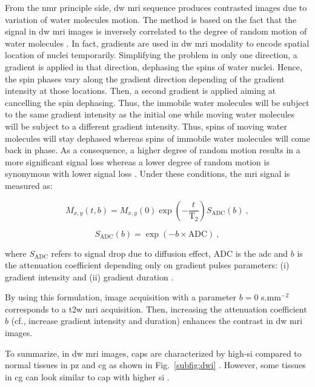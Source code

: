 From the \ac{nmr} principle side, \ac{dw} \ac{mri} sequence produces contrasted images due to variation of water molecules motion.
The method is based on the fact that the signal in \ac{dw} \ac{mri} images is inversely correlated to the degree of random motion of water molecules \cite{Huisman2003}.
In fact, gradients are used in \ac{dw} \ac{mri} modality to encode spatial location of nuclei temporarily.
Simplifying the problem in only one direction, a gradient is applied in that direction, dephasing the spins of water nuclei.
Hence, the spin phases vary along the gradient direction depending of the gradient intensity at those locations.
Then, a second gradient is applied aiming at cancelling the spin dephasing.
Thus, the immobile water molecules will be subject to the same gradient intensity as the initial one while moving water molecules will be subject to a different gradient intensity.
Thus, spins of moving water molecules will stay dephased whereas spins of immobile water molecules will come back in phase.
As a consequence, a higher degree of random motion results in a more significant signal loss whereas a lower degree of random motion is synonymous with lower signal loss \cite{Huisman2003}.
Under these conditions, the \ac{mri} signal is measured as:

\begin{equation}
	M_{x,y}\left(t,b\right) = M_{x,y}(0) \exp \left( - \frac{t}{\text{T}_2} \right) S_{\text{ADC}}(b) \ , 
	\label{eq:t2dif}
\end{equation}

\begin{equation}
	S_{\text{ADC}}(b) = \exp \left( -b \times \text{ADC} \right) \ ,
	\label{eq:dif}
\end{equation}

\noindent where $S_{\text{ADC}}$ refers to signal drop due to diffusion effect, $\text{ADC}$ is the \acl{adc} and $b$ is the attenuation coefficient depending only on gradient pulses parameters: (i) gradient intensity and (ii) gradient duration \cite{LeBihan1986}.

By using this formulation, image acquisition with a parameter $b=0$ s.mm$^{-2}$ corresponds to a \ac{t2w} \ac{mri} acquisition.
Then, increasing the attenuation coefficient $b$ (cf., increase gradient intensity and duration) enhances the contrast in \ac{dw} \ac{mri} images.

To summarize, in \ac{dw} \ac{mri} images, \acp{cap} are characterized by high-\ac{si} compared to normal tissues in \ac{pz} and \ac{cg} as shown in Fig.~\ref{subfig:dwi} \cite{Barentsz2012}.
However, some tissues in \ac{cg} can look similar to \ac{cap} with higher \ac{si} \cite{Barentsz2012}.

